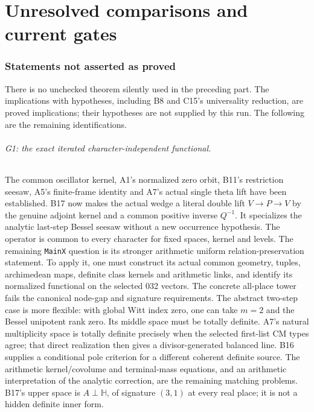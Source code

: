 \documentclass[11pt]{article}
\theoremstyle{definition}\newtheorem{definition}[theorem]{Definition}\newtheorem{remark}[theorem]{Remark}
\begin{document}
\part{Unresolved comparisons and current gates}
\section{Statements not asserted as proved}

There is no unchecked theorem silently used in the preceding part.
The implications with hypotheses, including B8 and C15's universality
reduction, are proved implications; their hypotheses are not supplied
by this run. The following are the remaining identifications.

\paragraph{G1: the exact iterated character-independent functional.}
The common oscillator kernel, A1's normalized zero orbit, B11's
restriction seesaw, A5's finite-frame identity and A7's actual single
theta lift have been established. B17 now makes the actual wedge
a literal double lift $V\to P\to V$ by the genuine adjoint
kernel and a common positive inverse $Q^{-1}$.
It specializes the analytic last-step Bessel seesaw without a
new occurrence hypothesis. The operator is common to every
character for fixed spaces, kernel and levels.
The remaining \texttt{MainX} question is its stronger arithmetic
uniform relation-preservation statement. To apply it, one must
construct its actual common geometry,
tuples, archimedean maps, definite class kernels and arithmetic links,
and identify its normalized functional on the selected 032 vectors.
The concrete all-place tower fails the canonical node-gap and
signature requirements. The abstract two-step case is more flexible:
with global Witt index zero, one can take $m=2$ and the Bessel
unipotent rank zero. Its middle space must be totally definite.
A7's natural multiplicity space is totally definite precisely when
the selected first-list CM types agree; that direct realization then
gives a divisor-generated balanced line. B16 supplies a conditional
pole criterion for a different coherent definite source.
The arithmetic kernel/covolume and terminal-mass equations,
and an arithmetic interpretation of the analytic correction,
are the remaining matching problems. B17's upper space is
$A\perp\mathbb H$, of signature $(3,1)$ at every real place;
it is not a hidden definite inner form.
\end{document}

